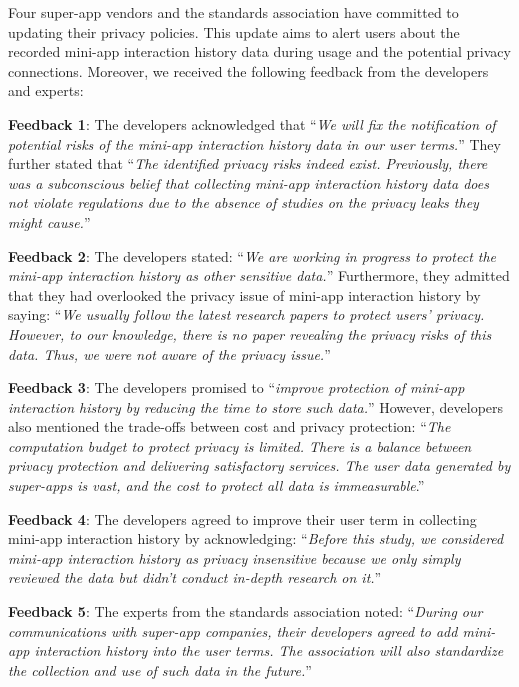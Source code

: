 Four super-app vendors and the standards association have committed to updating their privacy policies. This update aims to alert users about the recorded mini-app interaction history data during usage and the potential privacy connections. Moreover, we received the following feedback from the developers and experts:

\noindent \textbf{Feedback 1}: The developers acknowledged that ``\textit{We will fix the notification of potential risks of the mini-app interaction history data in our user terms.}'' They further stated that ``\textit{The identified privacy risks indeed exist. Previously, there was a subconscious belief that collecting mini-app interaction history data does not 
violate regulations due to the absence of studies on the privacy leaks they might cause.}''

\noindent \textbf{Feedback 2}: The developers stated: ``\textit{We are working in progress to protect the mini-app interaction history as other sensitive data.}'' Furthermore, they admitted that they had overlooked the privacy issue of mini-app interaction history by saying: ``\textit{We usually follow the latest research papers to protect users' privacy. However, to our knowledge, there is no paper revealing the privacy risks of this data. Thus, we were not aware of the privacy issue.}''

\noindent \textbf{Feedback 3}: The developers promised to ``\textit{improve protection of mini-app interaction history by reducing the time to store such data.}'' However, developers also mentioned the trade-offs between cost and privacy protection: ``\textit{The computation budget to protect privacy is limited. There is a balance between privacy protection and delivering satisfactory services. The user data generated by super-apps is vast, and the cost to protect all data is immeasurable}.''

\noindent \textbf{Feedback 4}: The developers agreed to improve their user term in collecting mini-app interaction history by acknowledging: ``\textit{Before this study, we considered mini-app interaction history as privacy insensitive because we only simply reviewed the data but didn't conduct in-depth research on it.}''

\noindent \textbf{Feedback 5}: The experts from the standards association noted: ``\textit{During our communications with super-app companies, their developers agreed to add mini-app interaction history into the user terms. The association will also standardize the collection and use of such data in the future.}''


